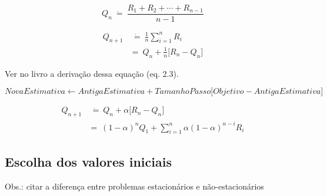 \documentclass{article}
\begin{document}
        \begin{equation}
            Q_n \ \dot{=} \ \frac{R_1 + R_2 + \cdots + R_{n-1}}{n - 1}
        \end{equation}
        
        \begin{equation}
        \begin{split}
            Q_{n+1} & \ \dot{=} \ \frac{1}{n} \sum_{i=1}^{n} R_i \\
            & = \ Q_n + \frac{1}{n} \Big[ R_n - Q_n \Big]
        \end{split}
        \end{equation}
        
        Ver no livro a derivação dessa equação (eq. 2.3).
        
        \begin{equation}
            NovaEstimativa \leftarrow AntigaEstimativa + TamanhoPasso \Big[ Objetivo - AntigaEstimativa \Big]
        \end{equation}
        
        \begin{equation}
        \begin{split}
            Q_{n+1} & \ \dot{=} \ Q_n + \alpha \Big[ R_n - Q_n \Big] \\
            & = \ (1 - \alpha)^n Q_1 + \sum_{i=1}^{n} \alpha (1 - \alpha)^{n - i} R_i
        \end{split}
        \end{equation}
        
    \subsection{Escolha dos valores iniciais}
        
        Obs.: citar a diferença entre problemas estacionários e não-estacionários
    
\end{document}
